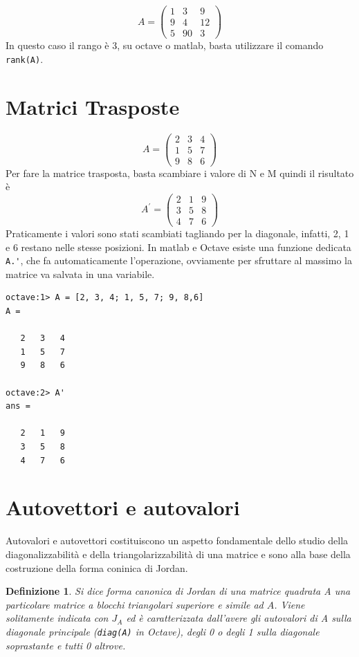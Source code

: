 \documentclass{book}
\newtheorem{defi}{Definizione}
\begin{document}
\begin{equation*}
  A=\begin{pmatrix}
      1 & 3 & 9\\
      9 & 4 & 12\\
      5 & 90 & 3
  \end{pmatrix}
\end{equation*}
In questo caso il rango è 3, su octave o matlab, basta utilizzare il comando
\lstinline|rank(A)|.\\

\section{Matrici Trasposte}
\label{sec:matt}
\begin{equation*}
  A = \begin{pmatrix}
    2 & 3 & 4\\
    1 & 5 & 7\\
    9 & 8 & 6        
  \end{pmatrix}
\end{equation*}
Per fare la matrice trasposta, basta scambiare i valore di N e M quindi il risultato è
\begin{equation*}
  A^\prime=
  \begin{pmatrix}
    2  & 1 &  9\\
    3  & 5 &  8\\
    4  & 7 &  6
  \end{pmatrix}
\end{equation*}
Praticamente i valori sono stati scambiati tagliando per la diagonale,
infatti, 2, 1 e 6 restano nelle stesse posizioni. In matlab e Octave esiste una
funzione dedicata \lstinline|A.'|, che fa automaticamente l'operazione,
ovviamente per sfruttare al massimo la matrice va salvata in una variabile.
\begin{verbatim}
octave:1> A = [2, 3, 4; 1, 5, 7; 9, 8,6]
A =

   2   3   4
   1   5   7
   9   8   6

octave:2> A'
ans =

   2   1   9
   3   5   8
   4   7   6
\end{verbatim}

\section{Autovettori e autovalori}
\label{sec:autovettorieautovalori}

Autovalori e autovettori costituiscono un aspetto fondamentale dello studio della
diagonalizzabilità e della triangolarizzabilità di una matrice e sono alla base
della costruzione della forma coninica di Jordan.
\begin{defi}
  Si dice forma canonica di Jordan di una matrice quadrata A una particolare matrice a
  blocchi triangolari superiore e simile ad $A$. Viene solitamente indicata con $J_A$ ed
  è caratterizzata dall'avere gli autovalori di A sulla diagonale principale
  (\lstinline|diag(A)| in Octave), degli 0 o degli 1 sulla diagonale soprastante e tutti
  0 altrove. 
\end{defi}
\end{document}

